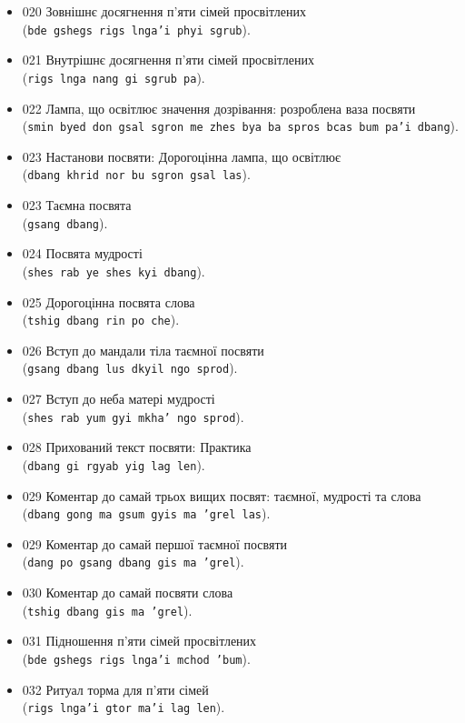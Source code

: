 \documentclass{article}
\begin{document}
\begingroup\raggedright
\begin{itemize}
\item 020 Зовнішнє досягнення п'яти сімей просвітлених \\ (\texttt{bde gshegs rigs lnga'i phyi sgrub}).
\item 021 Внутрішнє досягнення п'яти сімей просвітлених \\ (\texttt{rigs lnga nang gi sgrub pa}).
\item 022 Лампа, що освітлює значення дозрівання: розроблена ваза посвяти \\ (\texttt{smin byed don gsal sgron me zhes bya ba spros bcas bum pa'i dbang}).
\item 023 Настанови посвяти: Дорогоцінна лампа, що освітлює \\ (\texttt{dbang khrid nor bu sgron gsal las}).
\item 023 Таємна посвята \\ (\texttt{gsang dbang}).
\item 024 Посвята мудрості \\ (\texttt{shes rab ye shes kyi dbang}).
\item 025 Дорогоцінна посвята слова \\ (\texttt{tshig dbang rin po che}).
\item 026 Вступ до мандали тіла таємної посвяти \\ (\texttt{gsang dbang lus dkyil ngo sprod}).
\item 027 Вступ до неба матері мудрості \\ (\texttt{shes rab yum gyi mkha' ngo sprod}).
\item 028 Прихований текст посвяти: Практика \\ (\texttt{dbang gi rgyab yig lag len}).
\item 029 Коментар до самай трьох вищих посвят: таємної, мудрості та слова \\ (\texttt{dbang gong ma gsum gyis ma 'grel las}).
\item 029 Коментар до самай першої таємної посвяти \\ (\texttt{dang po gsang dbang gis ma 'grel}).
\item 030 Коментар до самай посвяти слова \\ (\texttt{tshig dbang gis ma 'grel}).
\item 031 Підношення п'яти сімей просвітлених \\ (\texttt{bde gshegs rigs lnga'i mchod 'bum}).
\item 032 Ритуал торма для п’яти сімей \\ (\texttt{rigs lnga'i gtor ma'i lag len}).

\end{itemize}
\end{document}
